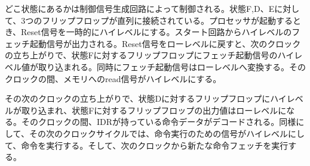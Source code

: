 \documentclass[paper]{ieicej}
\begin{document}
どこ状態にあるかは制御信号生成回路によって制御される。状態F,D、Eに対して、3つのフリップフロップが直列に接続されている。プロセッサが起動するとき、Reset信号を一時的にハイレベルにする。スタート回路からハイレベルのフェッチ起動信号が出力される。Reset信号をローレベルに戻すと、次のクロックの立ち上がりで、状態Fに対するフリップフロップにフェッチ起動信号のハイレベル値が取り込まれる。同時にフェッチ起動信号はローレベルへ変換する。そのクロックの間、メモリへのread信号がハイレベルにする。

その次のクロックの立ち上がりで、状態Dに対するフリップフロップにハイレベルが取り込まれ、状態Fに対するフリップフロップの出力値はローレベルになる。そのクロックの間、IDRが持っている命令データがデコードされる。同様にして、その次のクロックサイクルでは、命令実行のための信号がハイレベルにして、命令を実行する。そして、次のクロックから新たな命令フェッチを実行する。








\end{document}
